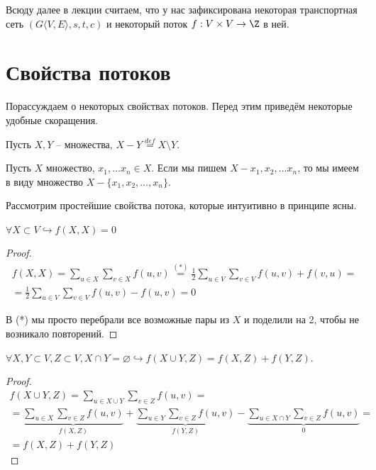 Всюду далее в лекции считаем, что у нас зафиксирована некоторая транспортная сеть $(G\langle V, E \rangle, s, t, c)$ и некоторый поток $f: V \times V \to \Z$ в ней.

\section{Свойства потоков}

Порассуждаем о некоторых свойствах потоков. Перед этим приведём некоторые удобные скоращения.

\Def Пусть $X, Y$ -- множества, $X - Y \overset{def}{=} X \setminus Y$.

\Def Пусть $X$ множество, $x_1, \dots x_n \in X$. Если мы пишем $X - x_1, x_2, \dots x_n$, то мы имеем в виду множество $X - \{x_1, x_2, \dots, x_n\}$.

Рассмотрим простейшие свойства потока, которые интуитивно в принципе ясны.

\St $\forall X \subset V \hookrightarrow f(X, X) = 0$
\begin{proof}
    \begin{multline*}
        f(X, X) = \sum\limits_{u \in X} \sum\limits_{v \in X} f(u, v) \overset{(*)}{=} \frac{1}{2} \sum\limits_{u \in V} \sum\limits_{v \in V} f(u, v) + f(v, u) = \\
        = \frac{1}{2} \sum\limits_{u \in V} \sum\limits_{v \in V} f(u, v) - f(u, v) = 0
    \end{multline*}

    В (*) мы просто перебрали все возможные пары из $X$ и поделили на 2, чтобы не возникало повторений.
\end{proof}

\St $\forall X, Y \subset V, Z \subset V, X \cap Y = \varnothing \hookrightarrow f(X \cup Y, Z) = f(X, Z) + f(Y, Z)$.
\begin{proof}
    \begin{multline*}
        f(X \cup Y, Z) = \sum\limits_{u \in X \cup Y} \sum\limits_{v \in Z} f(u, v) = \\ 
        = \underbrace{\sum\limits_{u \in X} \sum\limits_{v \in Z} f(u, v)}_{f(X, Z)} +  \underbrace{\sum\limits_{u \in Y} \sum\limits_{v \in Z} f(u, v)}_{f(Y, Z)} - \underbrace{\sum\limits_{u \in X \cap Y} \sum\limits_{v \in Z} f(u, v)}_{0} = \\
        = f(X, Z) + f(Y, Z)
    \end{multline*}
\end{proof}

